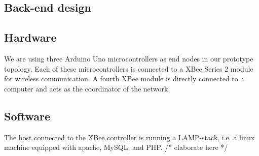 
\subsection{Back-end design}

\subsection{Hardware}
We are using three Arduino Uno microcontrollers as end nodes in our prototype topology. Each of these microcontrollers is connected to a XBee Series 2 module for wireless communication. A fourth XBee module is directly connected to a computer and acts as the coordinator of the network.

\subsection{Software}
The host connected to the XBee controller is running a LAMP-stack, i.e. a linux machine equipped with apache, MySQL, and PHP.
/* elaborate here */


